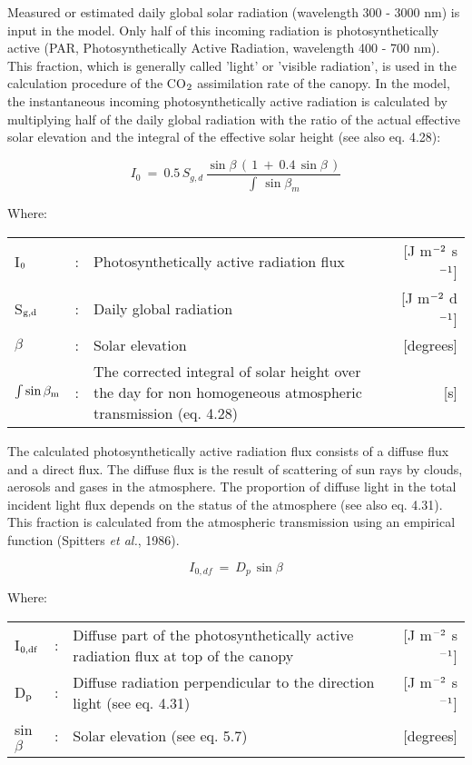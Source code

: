 Measured or estimated daily global solar radiation  (wavelength 300 - 3000 nm) is input
in the model. Only half of this incoming radiation is photosynthetically active (PAR,
Photosynthetically Active Radiation, wavelength 400 - 700 nm). This fraction, which is
generally called 'light' or 'visible radiation', is used in the calculation procedure of the
CO$_{{\rm 2}}$ assimilation rate of the canopy. In the model, the instantaneous incoming photosyn\-thet\-ically active radiation is calculated by multiply\-ing half of the daily global radiation
with the ratio of the actual effective solar elevation and the integral of the effective solar
height (see also eq. 4.28):

\begin{equation}
I _{0} ~=~ 0.5\, S _{g,d} \,{\frac{\sin \beta \, (\, 1~+~0.4\, \sin \beta \, )}{\int \, \sin \beta _{m} }}
\end{equation}

Where:\\[5pt]
\begin{tabularx}{\textwidth}{llXr}
I$_{{\rm 0}}$ &:& Photosynthetically active radia\-tion flux    &    [J m$^{{\rm -2}}$ s$^{{\rm -1}}$]\\
S$_{{\rm g,d}}$ &:& Daily global radiation   &     [J m$^{{\rm -2}}$ d$^{{\rm -1}}$] \\
$\beta$ &:& Solar elevation    &    [degrees]\\
$\int \sin \beta_{{\rm m}}$ &:& The corrected integral of solar height over the day 
    for non homogeneous atmospheric transmission (eq. 4.28)   &     [s]\\
\end{tabularx}

The calculated photosynthetically active radiation flux consists of a diffuse flux and a
direct flux. The diffuse flux is the result of scattering of sun rays by clouds, aerosols and
gases in the atmosphere. The proportion of diffuse light in the total incident light flux
depends on the status of the atmosphere (see also eq. 4.31). This fraction is calculated
from the atmospheric transmission using an empirical function (Spitters {\it et al.}, 1986).

\begin{equation}
I_{0,df} ~=~ D _{p~} \sin \beta
\end{equation}

Where:\\[5pt]
\begin{tabularx}{\textwidth}{llXr}
I$_{{\rm 0,df}}$ &:& Diffuse part of the photosynthetically active radiation flux 
   at top of the canopy    &    [J m$^{{\rm -2}}$ s$^{{\rm -1}}$]\\
D$_{{\rm p}}$ &:& Diffuse radiation perpendicular to the direction 
   light (see eq. 4.31)    &    [J m$^{{\rm -2}}$ s$^{{\rm -1}}$]\\
sin$\beta$ &:& Solar elevation (see eq. 5.7)    &    [degrees]\\
\end{tabularx}

